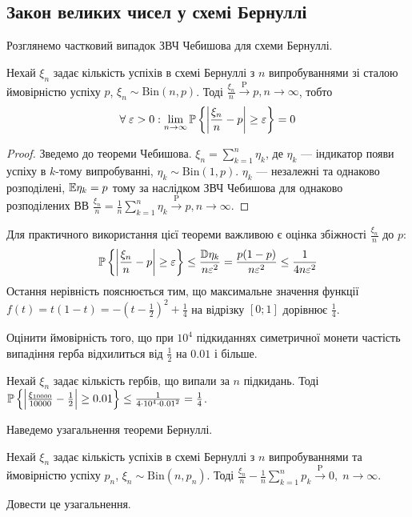 \subsection{Закон великих чисел у схемі Бернуллі}
Розглянемо частковий випадок ЗВЧ Чебишова для схеми Бернуллі.
\begin{theorem*}
    Нехай $\xi_n$ задає кількість успіхів в схемі Бернуллі з $n$ випробуваннями зі сталою ймовірністю успіху $p$, $\xi_n \sim \mathrm{Bin}(n, p)$. Тоді 
    $\frac{\xi_n}{n}  \overset{\mathrm{P}}{\longrightarrow} p, n\to\infty$, тобто
    \begin{gather}
        \forall \; \varepsilon >0 : \lim_{n \rightarrow \infty} \P\left\{ \left| \frac{\xi_n}{n} - p\right| \geq \varepsilon\right\} = 0
    \end{gather}
\end{theorem*}
\begin{proof}
    Зведемо до теореми Чебишова. $\xi_n = \sum\limits_{k=1}^n \eta_k$, де $\eta_k$ --- індикатор появи успіху в $k$-тому випробуванні,
    $\eta_k \sim \mathrm{Bin}(1, p)$. $\eta_k$ --- незалежні та однаково розподілені, $\E\eta_k = p$ тому за наслідком ЗВЧ Чебишова для однаково
    розподілених ВВ
    $\frac{\xi_n}{n} = \frac{1}{n} \sum\limits_{k=1}^n \eta_k \overset{\mathrm{P}}{\longrightarrow} p, n\to\infty$.
\end{proof}
\begin{remark}
    Для практичного використання цієї теореми важливою є оцінка збіжності $\frac{\xi_n}{n}$ до $p$:
    $$\P\left\{ \left| \frac{\xi_n}{n} - p\right| \geq \varepsilon\right\} \leq \frac{\D\eta_k}{n \varepsilon^2} = \frac{p(1-p)}{n \varepsilon^2} \leq \frac{1}{4n \varepsilon^2}$$
    Остання нерівність пояснюється тим, що максимальне значення функції $f(t) = t(1-t) = -\left(t - \frac{1}{2}\right)^2 + \frac{1}{4}$ на відрізку $[0;1]$ дорівнює $\frac{1}{4}$.
\end{remark}
\begin{example}
    Оцінити ймовірність того, що при $10^4$ підкиданнях симетричної монети частість випадіння герба відхилиться від $\frac{1}{2}$ на $0.01$ і більше.

    Нехай $\xi_n$ задає кількість гербів, що випали за $n$ підкидань. Тоді
    $\P\left\{ \left| \frac{\xi_{10000}}{10000} - \frac{1}{2}\right| \geq 0.01\right\} \leq \frac{1}{4\cdot 10^4 \cdot 0.01^2} = \frac{1}{4}$.
\end{example}
Наведемо узагальнення теореми Бернуллі.
\begin{theorem*}
    Нехай $\xi_n$ задає кількість успіхів в схемі Бернуллі з $n$ випробуваннями та ймовірністю успіху $p_n$, $\xi_n \sim \mathrm{Bin}(n, p_n)$.
    Тоді 
    $\frac{\xi_n}{n} - \frac{1}{n}\sum\limits_{k=1}^n p_k \overset{\mathrm{P}}{\longrightarrow} 0, \; n \to \infty$.
\end{theorem*}
\begin{exercise}
    Довести це узагальнення.
\end{exercise}

